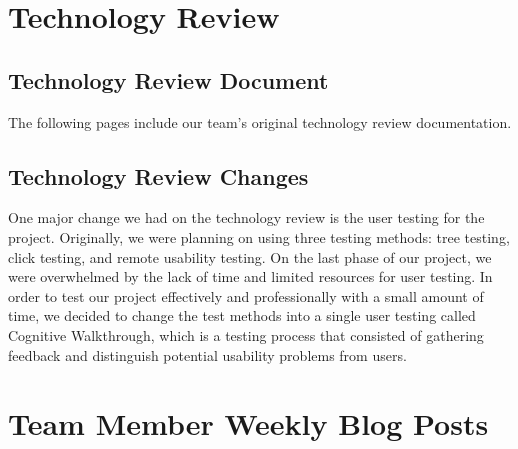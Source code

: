 \documentclass[onecolumn, draftclsnofoot,10pt, compsoc]{IEEEtran}
\begin{document}
\section{Technology Review}
\subsection{Technology Review Document}
\vspace{2cm}\hspace{2.4cm}
\noindent The following pages include our team's original technology review documentation.
\\
 
\subsection{Technology Review Changes}
One major change we had on the technology review is the user testing for the project. Originally, we were planning on using three testing methods: tree testing, click testing, and remote usability testing. On the last phase of our project, we were overwhelmed by the lack of time and limited resources for user testing. In order to test our project effectively and professionally with a small amount of time, we decided to change the test methods into a single user testing called Cognitive Walkthrough, which is a testing process that consisted of gathering feedback and distinguish potential usability problems from users.
\newpage
\section{Team Member Weekly Blog Posts}
\end{document}

